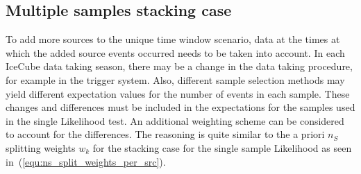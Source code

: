 \subsection{Multiple samples stacking case}
To add more sources to the unique time window scenario, data at the times at which the added source events occurred needs to be taken into account.
In each IceCube data taking season, there may be a change in the data taking procedure, for example in the trigger system.
Also, different sample selection methods may yield different expectation values for the number of events in each sample.
These changes and differences must be included in the expectations for the samples used in the single Likelihood test.
An additional weighting scheme can be considered to account for the differences.
The reasoning is quite similar to the a priori $n_S$ splitting weights $w_k$ for the stacking case for the single sample Likelihood as seen in~(\ref{equ:ns_split_weights_per_src}).

